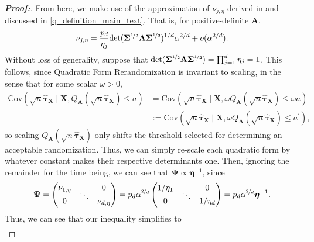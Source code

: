 \documentclass[11pt,twoside]{article}
\theoremstyle{definition}
\theoremstyle{remark}
\begin{document}
\begin{proof}[\textbf{Proof:}]
From here, we make use of the approximation of $\nu_{j, \eta}$ derived in \cite{lu2023design} and discussed in \cref{q_definition_main_text}. That is, for positive-definite $\mathbf{A}$,
\begin{align*}
    \nu_{j, \eta} = \frac{p_d}{\eta_j} \text{det}(\mathbf{\Sigma}^{\nicefrac{1}{2}}\mathbf{A}\mathbf{\Sigma}^{\nicefrac{1}{2}})^{1/d} \alpha^{2/d} + o(\alpha^{2/d}).
\end{align*}
 Without loss of generality, suppose that $\text{det}(\mathbf{\Sigma}^{\nicefrac{1}{2}} \mathbf{A} \mathbf{\Sigma}^{\nicefrac{1}{2}}) = \prod^d_{j=1} \eta_j = 1$. This follows, since Quadratic Form Rerandomization is invariant to scaling, in the sense that for some scalar $\omega > 0$,
\begin{align*}
    \text{Cov}\left(\sqrt{n}\widehat{\bm{\tau}}_{\mathbf{X}} \mid \mathbf{X}, Q_{\mathbf{A}}(\sqrt{n} \widehat{\bm{\tau}}_{\mathbf{X}}) \leq a\right) &= \text{Cov}\left(\sqrt{n}\widehat{\bm{\tau}}_{\mathbf{X}} \mid \mathbf{X}, \omega Q_{\mathbf{A}}(\sqrt{n} \widehat{\bm{\tau}}_{\mathbf{X}}) \leq \omega a\right) \\
    &:= \text{Cov}\left(\sqrt{n}\widehat{\bm{\tau}}_{\mathbf{X}} \mid \mathbf{X}, \omega Q_{\mathbf{A}}(\sqrt{n} \widehat{\bm{\tau}}_{\mathbf{X}}) \leq a^{\prime}\right),
\end{align*}
so scaling $Q_{\mathbf{A}}(\sqrt{n} \widehat{\bm{\tau}}_{\mathbf{X}})$ only shifts the threshold selected for determining an acceptable randomization. Thus, we can simply re-scale each quadratic form by whatever constant makes their respective determinants one. Then, ignoring the remainder for the time being, we can see that $\mathbf{\Psi} \propto \bm{\eta}^{-1}$, since 
\begin{align*}
    \mathbf{\Psi} = \begin{pmatrix}
        \nu_{1, \eta} & & 0\\[-0.1in]
        & \ddots & \\[-0.1in]
        0 & & \nu_{d, \eta}
    \end{pmatrix} = p_d \alpha^{\nicefrac{2}{d}}\begin{pmatrix}
        1 / \eta_1 & & 0\\[-0.1in]
        & \ddots & \\[-0.1in]
        0 & & 1/ \eta_d
    \end{pmatrix} = p_d \alpha^{\nicefrac{2}{d}} \bm{\eta}^{-1}.
\end{align*}
Thus, we can see that our inequality simplifies to
\begin{align*}

\end{align*}
\end{proof}
\end{document}
